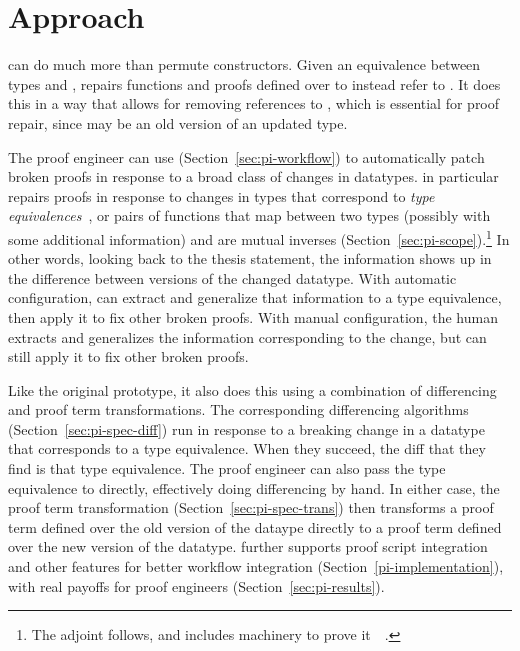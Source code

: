 \section{Approach}
\label{pi-approach}


\toolnamec can do much more than permute constructors.
Given an equivalence between types \Aa and \B,
\toolnamec repairs functions and proofs defined over \Aa to instead refer to \B.
It does this in a way that allows for removing references to \Aa, which is essential for proof repair,
since \Aa may be an old version of an updated type.

The proof engineer can use \toolnamec (Section~\ref{sec:pi-workflow}) to automatically patch broken proofs in response to a broad class of changes in datatypes.
\toolnamec in particular repairs proofs in response to changes in types that correspond to \textit{type equivalences}~\cite{univalent2013homotopy},
or pairs of functions that map between two types (possibly with some additional information) and are mutual inverses (Section~\ref{sec:pi-scope}).\footnote{The adjoint follows, and \toolnamec includes machinery to prove it~\href{https://github.com/uwplse/pumpkin-pi/blob/v2.0.0/plugin/src/automation/search/equivalence.ml}{}~\href{https://github.com/uwplse/pumpkin-pi/blob/v2.0.0/plugin/theories/Adjoint.v}{}.}
In other words, looking back to the thesis statement, the information shows up in the difference between versions of the changed datatype.
With automatic configuration, \toolname can extract and generalize that information to a type equivalence, then apply it to fix other broken proofs.
With manual configuration, the human extracts and generalizes the information corresponding to the change, but \toolnamec can still apply it
to fix other broken proofs.

Like the original \sysname prototype, it also does this using a combination of differencing and proof term transformations.
The corresponding differencing algorithms (Section~\ref{sec:pi-spec-diff}) run in response to a breaking change in a datatype that corresponds to a type equivalence.
When they succeed, the diff that they find is that type equivalence.
The proof engineer can also pass the type equivalence to \toolnamec directly, effectively doing differencing by hand.
In either case, the proof term transformation (Section~\ref{sec:pi-spec-trans}) then transforms a proof term defined over the old version of the dataype
directly to a proof term defined over the new version of the datatype.
\toolnamec further supports proof script integration and other features for better workflow integration (Section~\ref{pi-implementation}),
with real payoffs for proof engineers (Section~\ref{sec:pi-results}).

